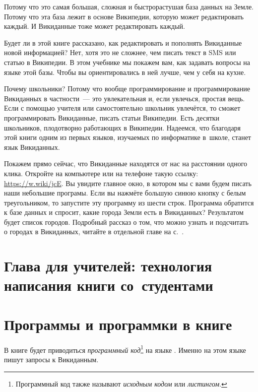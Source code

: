 Потому что это самая большая, сложная 
и быстрорастушая база данных на Земле. 
Потому что эта база лежит в основе Википедии, которую может редактировать каждый.
И Викиданные тоже может редактировать каждый. 

Будет ли в этой книге рассказано, как редактировать и пополнять Викиданные 
новой информацией? Нет, хотя это не сложнее, чем писать текст в SMS 
или статью в Википедии. В этом учебнике мы покажем вам, 
как задавать вопросы на языке этой базы. 
Чтобы вы ориентировались в ней лучше, чем у себя на кухне. 

Почему школьники? 
Потому что вообще программирование и программирование Викиданных в частности~--- это 
увлекательная и, если увлечься, простая вещь. 
Если с помощью учителя или самостоятельно школьник увлечётся, 
то сможет программировать Викиданные, писать статьи Википедии. 
Есть десятки школьников, плодотворно работающих в Википедии. 
Надеемся, что благодаря этой книги одним из первых языков, 
изучаемых по информатике в~школе, станет язык Викиданных.

Покажем прямо сейчас, что Викиданные находятся от нас на расстоянии одного клика.
Откройте на компьютере или на телефоне такую ссылку: 
\href{https://w.wiki/jcE}{https://w.wiki/jcE}. 
Вы увидите главное окно, в котором мы с вами будем писать наши небольшие програмы. 
Если вы нажмёте большую синюю кнопку с белым треугольником, 
то запустите 
эту программу из шести строк. Программа обратится к базе данных 
и спросит, какие города Земли есть в Викиданных?
Результатом будет список городов. 
Подробный рассказ о том, что можно узнать и подсчитать о городах в Викиданных,  
читайте в отдельной главе на с.~\pageref{ch:city}. 



\chapter{Глава для учителей: технология написания книги со~студентами}
\label{ch:howto-write-book}



\chapter{Программы и программки в книге}
\label{ch:listing_about}

В книге будет приводиться \emph{программный код}\footnote[][0cm]{%
    Программный код также называют  \emph{исходным кодом} или 
    \emph{листингом}.
%   
} на языке . 
Именно на этом языке пишут запросы к Викиданным.


